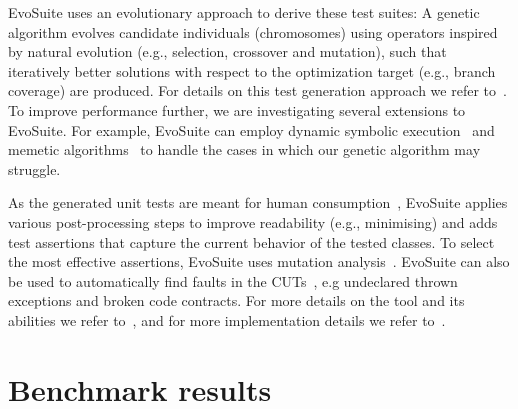 \documentclass[10pt,conference,compsocconf]{IEEEtran}
\newcommand{\EVOSUITE}{{\sc EvoSuite}\xspace}
\begin{document}
\EVOSUITE uses an evolutionary approach to derive these test suites: A
genetic algorithm evolves candidate individuals (chromosomes) using
operators inspired by natural evolution (e.g., selection, crossover
and mutation), such that iteratively better solutions with respect to
the optimization target (e.g., branch coverage) are produced.  For
details on this test generation approach we refer to~\cite{GoA_TSE12}.
To improve performance further, we are investigating several
extensions to \EVOSUITE. 
For example, \EVOSUITE can employ dynamic
symbolic execution~\cite{evoISSRE113} 
and memetic algorithms~\cite{fraser2014memetic}
to handle the cases in which our genetic algorithm may struggle. 


As the generated unit tests are meant for human consumption~\cite{fraser2013does}, \EVOSUITE
applies various post-processing steps to improve readability (e.g.,
minimising) and adds test assertions that capture the current
behavior of the tested classes. To select the most effective
assertions, \EVOSUITE uses mutation
analysis~\cite{10.1109/TSE.2011.93}. 
\EVOSUITE can also be used to automatically find faults in the CUTs~\cite{emse13_oracle}, e.g undeclared
thrown exceptions and broken code contracts.
 For more details on the tool and
its abilities we refer to~\cite{FrA11c}, and for more implementation
details we refer to~\cite{FrA13a}.



\section{Benchmark results}

\begin{table*}[t]
  \centering
  \caption{\label{table:results}Detailed results of \EVOSUITE on the SBST benchmark classes. Time is expressed in minutes.}
{}
\end{table*}
\end{document}
